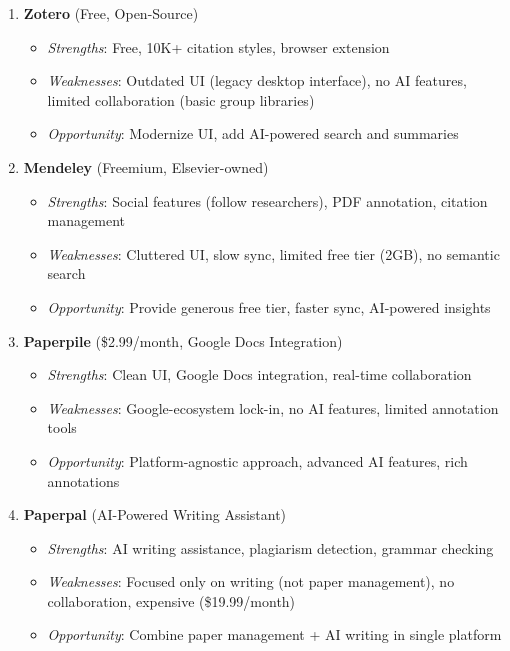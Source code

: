 \begin{enumerate}
    \item \textbf{Zotero} (Free, Open-Source)
          \begin{itemize}
              \item \textit{Strengths}: Free, 10K+ citation styles, browser extension
              \item \textit{Weaknesses}: Outdated UI (legacy desktop interface), no AI features, limited collaboration (basic group libraries)
              \item \textit{Opportunity}: Modernize UI, add AI-powered search and summaries
          \end{itemize}

    \item \textbf{Mendeley} (Freemium, Elsevier-owned)
          \begin{itemize}
              \item \textit{Strengths}: Social features (follow researchers), PDF annotation, citation management
              \item \textit{Weaknesses}: Cluttered UI, slow sync, limited free tier (2GB), no semantic search
              \item \textit{Opportunity}: Provide generous free tier, faster sync, AI-powered insights
          \end{itemize}

    \item \textbf{Paperpile} (\$2.99/month, Google Docs Integration)
          \begin{itemize}
              \item \textit{Strengths}: Clean UI, Google Docs integration, real-time collaboration
              \item \textit{Weaknesses}: Google-ecosystem lock-in, no AI features, limited annotation tools
              \item \textit{Opportunity}: Platform-agnostic approach, advanced AI features, rich annotations
          \end{itemize}

    \item \textbf{Paperpal} (AI-Powered Writing Assistant)
          \begin{itemize}
              \item \textit{Strengths}: AI writing assistance, plagiarism detection, grammar checking
              \item \textit{Weaknesses}: Focused only on writing (not paper management), no collaboration, expensive (\$19.99/month)
              \item \textit{Opportunity}: Combine paper management + AI writing in single platform
          \end{itemize}


\end{enumerate}
